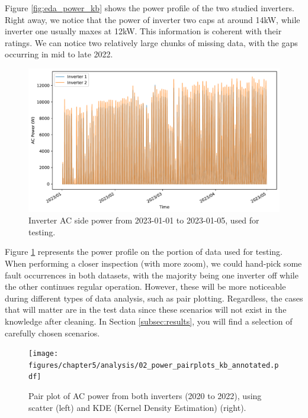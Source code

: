 Figure \ref{fig:eda_power_kb} shows the power profile of the two studied inverters. Right away, we notice that the power of inverter two caps at around 14kW, while inverter one usually maxes at 12kW. This information is coherent with their ratings. We can notice two relatively large chunks of missing data, with the gaps occurring in mid to late 2022.

\begin{figure}[h!]
    \centering
    \includegraphics[width=\textwidth]{figures/chapter5/analysis/01_power_test.pdf}
    \caption{Inverter AC side power from 2023-01-01 to 2023-01-05, used for testing.}
    \label{fig:eda_power_test}
\end{figure}

Figure \ref{fig:eda_power_test} represents the power profile on the portion of data used for testing. When performing a closer inspection (with more zoom), we could hand-pick some fault occurrences in both datasets, with the majority being one inverter off while the other continues regular operation. However, these will be more noticeable during different types of data analysis, such as pair plotting. Regardless, the cases that will matter are in the test data since these scenarios will not exist in the knowledge after cleaning. In Section \ref{subsec:results}, you will find a selection of carefully chosen scenarios.

\begin{figure}[h!]
    \centering
    \texttt{[image: figures/chapter5/analysis/02\_power\_pairplots\_kb\_annotated.pdf]}
    \caption{Pair plot of AC power from both inverters (2020 to 2022), using scatter (left) and KDE (Kernel Density Estimation) (right).}
    \label{fig:eda_power_kb_pair}
\end{figure}

